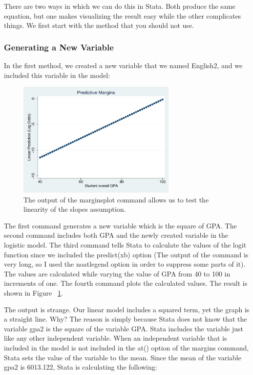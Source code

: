 \documentclass[a4paper,12pt,oneside]{book}
\begin{document}
There are two ways in which we can do this in Stata. Both produce the same equation, but one makes visualizing the result easy while the other complicates things. We first start with the method that you should not use.
\subsubsection{Generating a New Variable}
In the first method, we created a new variable that we named English2, and we included this variable in the model:

\begin{figure}[h]
    \centering
    \includegraphics[width=0.7\textwidth]{book_16.pdf}
    \caption{The output of the marginsplot command allows us to test the linearity of the slopes assumption.}
    \label{fig:quadratic1}
\end{figure}
\begin{stlog}\end{stlog}

The first command generates a new variable which is the square of GPA. The second command includes both GPA and the newly created variable in the logistic model. The third command tells Stata to calculate 
the values of the logit function since we included the predict(xb) option (The output of the command is very long, so I used the noatlegend option in order to suppress some parts of it). The values are calculated while 
varying the value of GPA from 40 to 100 in increments of one. The fourth command plots the calculated values. The result is shown in Figure ~\ref{fig:quadratic1}.

The output is strange. Our linear model includes a squared term, yet the graph is a straight line. Why? The reason is simply because Stata does not know that the variable gpa2 is the square of the variable GPA. 
Stata includes the variable just like any other independent variable. When an independent variable that is included in the model is not included in the at() option of the margins command, Stata sets the value of 
the variable to the mean. Since the mean of the variable gpa2 is 6013.122, Stata is calculating the following:
\end{document}
